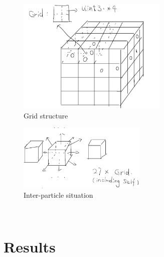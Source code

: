 \documentclass[acmtog]{acmart}
\begin{document}
\begin{figure}[!h]
	\includegraphics[width=7.2cm]{grid}
	\caption{Grid structure}
\end{figure}

\begin{figure}[!h]
	\includegraphics[width=6.1cm]{inter-particle}
	\caption{Inter-particle situation}
\end{figure}

\pagebreak
\quad \\

\pagebreak
\section{Results}

\vspace{20mm}
\end{document}
